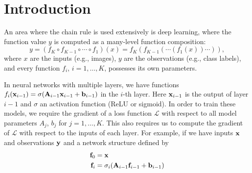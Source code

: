 \section{Introduction}
An area where the chain rule is used extensively is deep learning, where the function value \( y \) is computed as a many-level function composition:
\[ 
y = (f_K \circ f_{K-1} \circ \cdots \circ f_1)(x) = f_K(f_{K-1}(\cdots (f_1(x)) \cdots )),
\]
where \( x \) are the inputs (e.g., images), \( y \) are the observations (e.g., class labels), and every function \( f_i \), \( i = 1, \ldots, K \), possesses its own parameters.

In neural networks with multiple layers, we have functions $f_i({\mathbf{x}}_{i-1}) = \sigma(\mathbf{A}_{i-1}{\mathbf{x}}_{i-1}+{\mathbf{b}}_{i-1})$ in the $i$-th layer. Here ${\mathbf{x}}_{i-1}$ is the output of layer $i-1$ and $\sigma$ an activation function (\eg ReLU or sigmoid).  In order to train these models, we require the gradient of a loss function $\mathcal{L}$ with respect to all model parameters $A_j$, $b_j$ for $j=1,\dots,K$. This also requires us to compute the gradient of $\mathcal{L}$ with respect to the inputs of each layer. For example, if we have inputs ${\mathbf{x}}$ and observations ${\mathbf{y}}$ and a network structure defined by
\begin{align*}
	{\mathbf{f}}_0&={\mathbf{x}}\\
		  {\mathbf{f}}_i&=\sigma_i(\mathbf{A}_{i-1}{\mathbf{f}}_{i-1}+{\mathbf{b}}_{i-1})
\end{align*}
